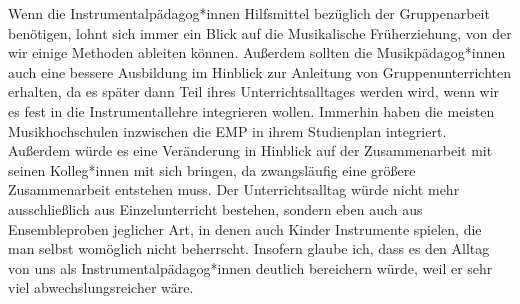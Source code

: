 Wenn die Instrumentalpädagog*innen Hilfsmittel bezüglich der Gruppenarbeit
benötigen, lohnt sich immer ein Blick auf die Musikalische Früherziehung, von
der wir einige Methoden ableiten können. Außerdem sollten die Musikpädagog*innen
auch eine bessere Ausbildung im Hinblick zur Anleitung von Gruppenunterrichten
erhalten, da es später dann Teil ihres Unterrichtsalltages werden wird, wenn wir
es fest in die Instrumentallehre integrieren wollen. Immerhin haben die meisten
Musikhochschulen inzwischen die EMP in ihrem Studienplan integriert. Außerdem
würde es eine Veränderung in Hinblick auf der Zusammenarbeit mit seinen
Kolleg*innen mit sich bringen, da zwangsläufig eine größere Zusammenarbeit
entstehen muss. Der Unterrichtsalltag würde nicht mehr ausschließlich aus
Einzelunterricht bestehen, sondern eben auch aus Ensembleproben jeglicher Art,
in denen auch Kinder Instrumente spielen, die man selbst womöglich nicht
beherrscht. Insofern glaube ich, dass es den Alltag von uns als
Instrumentalpädagog*innen deutlich bereichern würde, weil er sehr viel
abwechslungsreicher wäre. 













